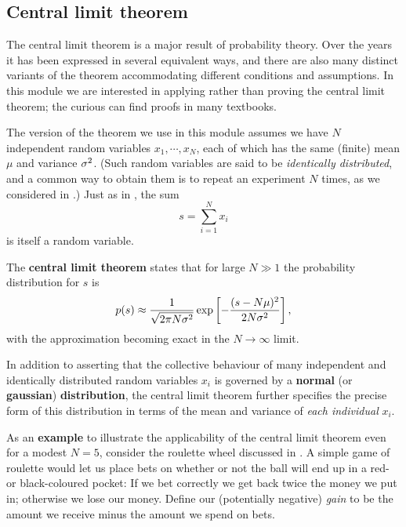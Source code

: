 \subsection{\label{sec:CLT}Central limit theorem}
The central limit theorem is a major result of probability theory.
Over the years it has been expressed in several equivalent ways, and there are also many distinct variants of the theorem accommodating different conditions and assumptions.
In this module we are interested in applying rather than proving the central limit theorem; the curious can find proofs in many textbooks.

The version of the theorem we use in this module assumes we have $N$ independent random variables $x_1, \cdots, x_N$, each of which has the same (finite) mean $\mu$ and variance $\sigma^2$.
(Such random variables are said to be \textit{identically distributed}, and a common way to obtain them is to repeat an experiment $N$ times, as we considered in .)
Just as in , the sum
\begin{equation*}
  s = \sum_{i = 1}^N x_i
\end{equation*}
is itself a random variable.

\begin{shaded}
  The \textbf{central limit theorem} states that for large $N \gg 1$ the probability distribution for $s$ is
  \begin{equation}
    p(s) \approx \frac{1}{\sqrt{2\pi N\sigma^2}} \exp\left[-\frac{(s - N\mu)^2}{2N\sigma^2}\right],
  \end{equation}
  with the approximation becoming exact in the $N \to \infty$ limit.
\end{shaded}
In addition to asserting that the collective behaviour of many independent and identically distributed random variables $x_i$ is governed by a \textbf{normal} (or \textbf{gaussian}) \textbf{distribution}, the central limit theorem further specifies the precise form of this distribution in terms of the mean and variance of \textit{each individual} $x_i$.

As an \textbf{example} to illustrate the applicability of the central limit theorem even for a modest $N = 5$, consider the roulette wheel discussed in .
A simple game of roulette would let us place bets on whether or not the ball will end up in a red- or black-coloured pocket: If we bet correctly we get back twice the money we put in; otherwise we lose our money.
Define our (potentially negative) \textit{gain} to be the amount we receive minus the amount we spend on bets.

